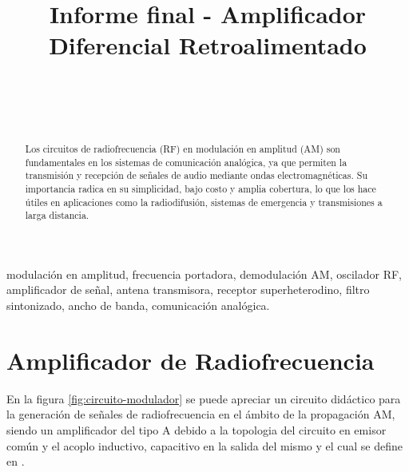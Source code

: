 \documentclass[conference]{IEEEtran}
\begin{document}
	
	\title{Informe final - Amplificador Diferencial Retroalimentado}
	\author{
		\\
		\\
		\\
		\and
		\and
	}
	
	\maketitle
	\begin{abstract}
		Los circuitos de radiofrecuencia (RF) en modulación en amplitud (AM) son fundamentales en los sistemas de comunicación analógica, ya que permiten la transmisión y recepción de señales de audio mediante ondas electromagnéticas. Su importancia radica en su simplicidad, bajo costo y amplia cobertura, lo que los hace útiles en aplicaciones como la radiodifusión, sistemas de emergencia y transmisiones a larga distancia.
	\end{abstract}
	
	\begin{IEEEkeywords}
		modulación en amplitud, frecuencia portadora, demodulación AM, oscilador RF, amplificador de señal, antena transmisora, receptor superheterodino, filtro sintonizado, ancho de banda, comunicación analógica.
	\end{IEEEkeywords}
	
	\section{Amplificador de Radiofrecuencia}
	
	En la figura \ref{fig:circuito-modulador} se puede apreciar un circuito didáctico para la generación de señales de radiofrecuencia en el ámbito de la propagación AM, siendo un amplificador del tipo A debido a la topologia del circuito en emisor común y el acoplo inductivo, capacitivo en la salida del mismo y el cual se define en \cite{boylestad2010}.
	
\end{document}
